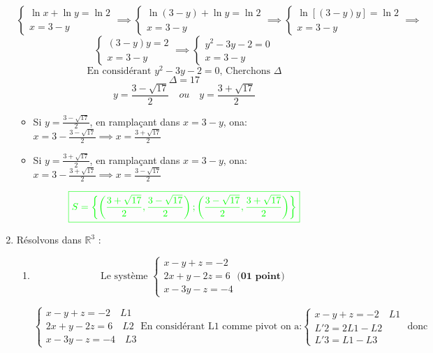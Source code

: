 \documentclass[12pt]{article}
\begin{document}
\begin{enumerate}
\[
\begin{cases}
\ln x + \ln y = \ln 2\\
x= 3-y 
\end{cases}\implies
\begin{cases}
\ln (3-y)  + \ln y = \ln 2\\
x= 3-y 
\end{cases}\implies
\begin{cases}
\ln\left[ (3-y)y\right]  = \ln 2\\
x= 3-y 
\end{cases}\implies
\]
\[
\begin{cases}
(3-y)y  = 2\\
x= 3-y 
\end{cases}\implies
\begin{cases}
y^{2}-3y-2 = 0\\
x= 3-y 
\end{cases}
\]
\[\text{En considérant } y^{2}-3y-2 = 0 \text{, Cherchons }\Delta \]
\[\Delta=17 \]
\[y=\frac{3-\sqrt{17}}{2}\quad ou \quad y=\frac{3+\sqrt{17}}{2} \]
\begin{itemize}
\item Si $y=\frac{3-\sqrt{17}}{2}$, en ramplaçant dans $x= 3-y $, ona: $x=3-\frac{3-\sqrt{17}}{2}\implies x=\frac{3+\sqrt{17}}{2}$
\item Si $y=\frac{3+\sqrt{17}}{2}$, en ramplaçant dans $x= 3-y $, ona: $x=3-\frac{3+\sqrt{17}}{2}\implies x=\frac{3-\sqrt{17}}{2}$
\end{itemize}
\[\textcolor{green}{\boxed{S=\left\lbrace \left(\frac{3+\sqrt{17}}{2}, \frac{3-\sqrt{17}}{2} \right);\left(\frac{3-\sqrt{17}}{2}, \frac{3+\sqrt{17}}{2}\right)   \right\rbrace }}\]
\item Résolvons dans $\mathbb{R}^{3}$ :
\begin{enumerate}
\item \[ \text{Le système }
\begin{cases}
x-y+z = -2\\
2x+y-2z = 6\\
x-3y-z=-4
\end{cases}  \textbf{(01 point)}\]

\[
\begin{cases}
x-y+z = -2\quad L1\\
2x+y-2z = 6\quad L2\\
x-3y-z=-4\quad L3
\end{cases}\text{En considérant L1 comme pivot on a:}
\begin{cases}
x-y+z = -2\quad L1\\
L'2=2L1-L2\\
L'3=L1-L3
\end{cases}\text{ donc }
\]


\end{enumerate}
\end{enumerate}
\end{document}
